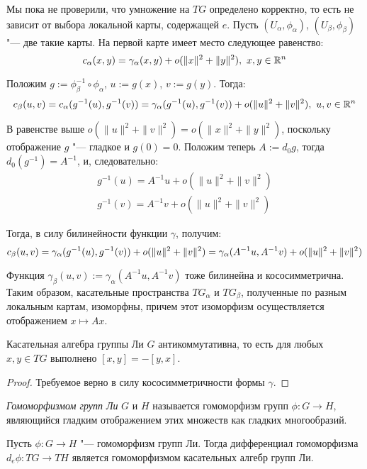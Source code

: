 \begin{note}
	Мы пока не проверили, что умножение на $T{G}$ определено корректно, то есть не зависит от выбора локальной карты, содержащей $e$. Пусть $(U_\alpha, \phi_\alpha)$, $(U_\beta, \phi_\beta)$ "--- две такие карты. На первой карте имеет место следующее равенство:
	\[c_\alpha(x, y) = \gamma_\alpha(x, y) + o(\|x\|^2 + \|y\|^2),~x, y \in \mathbb{R}^n\]
	
	Положим $g := \phi_\beta^{-1} \circ \phi_\alpha$, $u := g(x)$, $v := g(y)$. Тогда:
	\[c_\beta(u, v) = c_\alpha(g^{-1}(u), g^{-1}(v)) = \gamma_\alpha(g^{-1}(u), g^{-1}(v)) + o(\|u\|^2 + \|v\|^2),~u, v \in \mathbb{R}^n\]
	
	В равенстве выше $o(\|u\|^2 + \|v\|^2) = o(\|x\|^2 + \|y\|^2)$, поскольку отображение $g$ "--- гладкое и $g(0) = 0$. Положим теперь $A := d_0g$, тогда $d_0(g^{-1}) = A^{-1}$, и, следовательно:
	\begin{gather*}
		g^{-1}(u) = A^{-1}u + o(\|u\|^2 + \|v\|^2) \\
		g^{-1}(v) = A^{-1}v + o(\|u\|^2 + \|v\|^2)
	\end{gather*}
	
	Тогда, в силу билинейности функции $\gamma$, получим:
	\[c_\beta(u, v) = \gamma_\alpha(g^{-1}(u), g^{-1}(v)) + o(\|u\|^2 + \|v\|^2) = \gamma_\alpha(A^{-1}u, A^{-1}v) + o(\|u\|^2 + \|v\|^2)\]
	
	Функция $\gamma_\beta(u, v) := \gamma_\alpha(A^{-1}u, A^{-1}v)$ тоже билинейна и кососимметрична. Таким образом, касательные пространства $TG_\alpha$ и $TG_\beta$, полученные по разным локальным картам, изоморфны, причем этот изоморфизм осуществляется отображением $x \mapsto Ax$.
\end{note}

\begin{proposition}
	Касательная алгебра группы Ли $G$ антикоммутативна, то есть для любых $x, y \in TG$ выполнено $[x, y] = -[y, x]$.
\end{proposition}

\begin{proof}
	Требуемое верно в силу кососимметричности формы $\gamma$.
\end{proof}

\begin{definition}
	\textit{Гомоморфизмом групп Ли} $G$ и $H$ называется гомоморфизм групп $\phi: G \to H$, являющийся гладким отображением этих множеств как гладких многообразий.
\end{definition}

\begin{theorem}
	Пусть $\phi : G \to H$ "--- гомоморфизм групп Ли. Тогда дифференциал гомоморфизма $d_e\phi: TG \to TH$ является гомоморфизмом касательных алгебр групп Ли.
\end{theorem}


